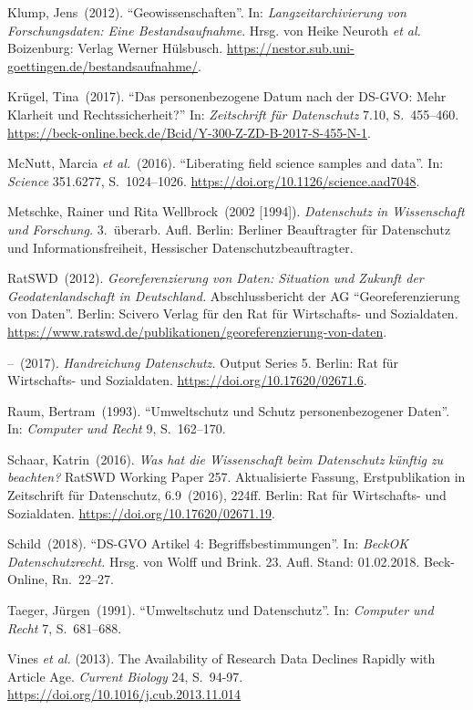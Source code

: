 \documentclass[a4paper,
fontsize=11pt,
oneside,
numbers=noperiodatend,
parskip=half-,
bibliography=totoc,
final
]{scrartcl}
\begin{document}
Klump, Jens~(2012). \enquote{Geowissenschaften}. In:
\emph{Langzeitarchivierung von Forschungsdaten: Eine Bestandsaufnahme}.
Hrsg. von Heike Neuroth \emph{et al.} Boizenburg: Verlag Werner
Hülsbusch. \url{https://nestor.sub.uni-goettingen.de/bestandsaufnahme/}.

Krügel, Tina~(2017). \enquote{Das personenbezogene Datum nach der
DS-GVO: Mehr Klarheit und Rechtssicherheit?} In: \emph{Zeitschrift für
Datenschutz} 7.10, S.~455--460.
\url{https://beck-online.beck.de/Bcid/Y-300-Z-ZD-B-2017-S-455-N-1}.

McNutt, Marcia \emph{et al.}~(2016). \enquote{Liberating field science
samples and data}. In: \emph{Science} 351.6277, S.~1024--1026.
\url{https://doi.org/10.1126/science.aad7048}.

Metschke, Rainer und Rita Wellbrock~(2002 {[}1994{]}). \emph{Datenschutz
in Wissenschaft und Forschung.} 3.~überarb. Aufl. Berlin: Berliner
Beauftragter für Datenschutz und Informationsfreiheit, Hessischer
Datenschutzbeauftragter.

RatSWD~(2012). \emph{Georeferenzierung von Daten: Situation und Zukunft
der Geodatenlandschaft in Deutschland.} Abschlussbericht der AG
\enquote{Georeferenzierung von Daten}. Berlin: Scivero Verlag für den
Rat für Wirtschafts- und Sozialdaten.
\url{https://www.ratswd.de/publikationen/georeferenzierung-von-daten}.

--~(2017). \emph{Handreichung Datenschutz.} Output Series 5. Berlin: Rat
für Wirtschafts- und Sozialdaten.
\url{https://doi.org/10.17620/02671.6}.

Raum, Bertram~(1993). \enquote{Umweltschutz und Schutz personenbezogener
Daten}. In: \emph{Computer und Recht} 9, S.~162--170.

Schaar, Katrin~(2016). \emph{Was hat die Wissenschaft beim Datenschutz
künftig zu beachten?} RatSWD Working Paper 257. Aktualisierte Fassung,
Erstpublikation in Zeitschrift für Datenschutz, 6.9~(2016), 224ff.
Berlin: Rat für Wirtschafts- und Sozialdaten.
\url{https://doi.org/10.17620/02671.19}.

Schild~(2018). \enquote{DS-GVO Artikel 4: Begriffsbestimmungen}. In:
\emph{BeckOK Datenschutzrecht.} Hrsg. von Wolff und Brink. 23. Aufl.
Stand: 01.02.2018. Beck-Online, Rn.~22--27.

Taeger, Jürgen~(1991). \enquote{Umweltschutz und Datenschutz}. In:
\emph{Computer und Recht} 7, S.~681--688.

Vines \emph{et al.} (2013). The Availability of Research Data Declines
Rapidly with Article Age. \emph{Current Biology} 24, S.~94-97.
\url{https://doi.org/10.1016/j.cub.2013.11.014}
\end{document}
